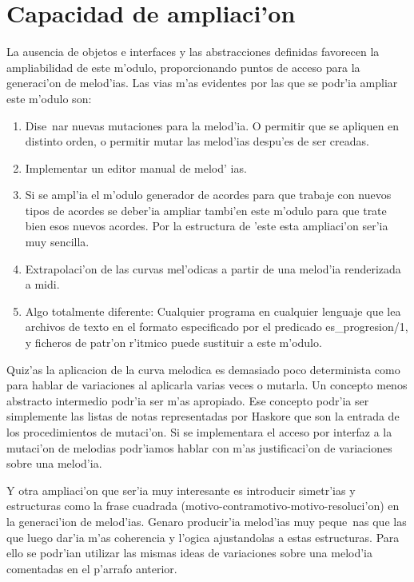 ﻿\documentclass[a4paper,12pt]{article}
\begin{document}
\section {Capacidad de ampliaci'on}
La ausencia de objetos e interfaces y las abstracciones definidas favorecen la ampliabilidad de este m'odulo, proporcionando puntos de acceso para la generaci'on de melod'ias. Las vias m'as evidentes por las que se podr'ia ampliar este m'odulo son:
	\begin{enumerate}
	\item Dise~nar nuevas mutaciones para la melod'ia. O permitir que se apliquen en distinto orden, o permitir mutar las melod'ias despu'es de ser creadas.
	\item Implementar un editor manual de melod' ias.
	\item Si se ampl'ia el m'odulo generador de acordes para que trabaje con nuevos tipos de acordes se deber'ia ampliar tambi'en este m'odulo para que trate bien esos nuevos acordes. Por la estructura de 'este esta ampliaci'on ser'ia muy sencilla.
	\item Extrapolaci'on de las curvas mel'odicas a partir de una melod'ia renderizada a midi.
	\item Algo totalmente diferente: Cualquier programa en cualquier lenguaje que lea archivos de texto en el formato especificado por el predicado es\_progresion/1, y ficheros de patr'on r'itmico puede sustituir a este m'odulo.
	\end{enumerate}

Quiz'as la aplicacion de la curva melodica es demasiado poco determinista como para hablar de variaciones al aplicarla varias veces o mutarla. Un concepto menos abstracto intermedio podr'ia ser m'as apropiado. Ese concepto podr'ia ser simplemente las listas de notas representadas por Haskore que son la entrada de los procedimientos de mutaci'on. Si se implementara el acceso por interfaz a la mutaci'on de melodias podr'iamos hablar con m'as justificaci'on de variaciones sobre una melod'ia.

\newline
Y otra ampliaci'on que ser'ia muy interesante es introducir simetr'ias y estructuras como la frase cuadrada (motivo-contramotivo-motivo-resoluci'on) en la generaci'ion de melod'ias. Genaro producir'ia melod'ias muy peque~nas que las que luego dar'ia m'as coherencia y l'ogica ajustandolas a estas estructuras. Para ello se podr'ian utilizar las mismas ideas de variaciones sobre una melod'ia comentadas en el p'arrafo anterior.
\end{document}
